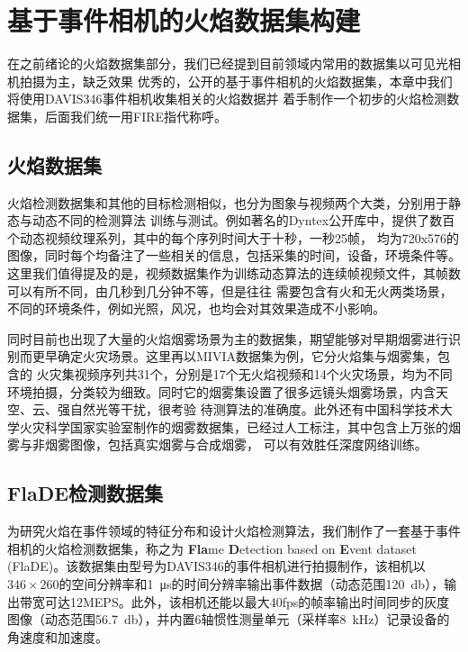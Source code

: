
\chapter{基于事件相机的火焰数据集构建}
在之前绪论的火焰数据集部分，我们已经提到目前领域内常用的数据集以可见光相机拍摄为主，缺乏效果
优秀的，公开的基于事件相机的火焰数据集，本章中我们将使用DAVIS346事件相机收集相关的火焰数据并
着手制作一个初步的火焰检测数据集，后面我们统一用FIRE指代称呼。

\section{火焰数据集}
火焰检测数据集和其他的目标检测相似，也分为图象与视频两个大类，分别用于静态与动态不同的检测算法
训练与测试。例如著名的Dyntex公开库\cite{peteri2008comprehensive}中，提供了数百个动态视频纹理系列，其中的每个序列时间大于十秒，一秒25帧，
均为720x576的图像，同时每个均备注了一些相关的信息，包括采集的时间，设备，环境条件等。这里我们值得提及的是，视频数据集作为训练动态算法的连续帧视频文件，其帧数可以有所不同，由几秒到几分钟不等，但是往往
需要包含有火和无火两类场景，不同的环境条件，例如光照，风况，也均会对其效果造成不小影响。

同时目前也出现了大量的火焰烟雾场景为主的数据集，期望能够对早期烟雾进行识别而更早确定火灾场景。这里再以MIVIA数据集\cite{foggia2015real}为例，它分火焰集与烟雾集，包含的
火灾集视频序列共31个，分别是17个无火焰视频和14个火灾场景，均为不同环境拍摄，分类较为细致。同时它的烟雾集设置了很多远镜头烟雾场景，内含天空、云、强自然光等干扰，很考验
待测算法的准确度。此外还有中国科学技术大学火灾科学国家实验室制作的烟雾数据集，已经过人工标注，其中包含上万张的烟雾与非烟雾图像，包括真实烟雾与合成烟雾，
可以有效胜任深度网络训练。

\section{FlaDE检测数据集}
为研究火焰在事件领域的特征分布和设计火焰检测算法，我们制作了一套基于事件相机的火焰检测数据集，称之为 \textbf{Fla}me \textbf{D}etection based on \textbf{E}vent dataset (FlaDE)。该数据集由型号为DAVIS346的事件相机进行拍摄制作，该相机以$346\times260$的空间分辨率和\SI{1}{\micro\second}的时间分辨率输出事件数据（动态范围\SI{120}{\decibel}），输出带宽可达12MEPS。此外，该相机还能以最大40fps的帧率输出时间同步的灰度图像（动态范围\SI{56.7}{\decibel}），并内置6轴惯性测量单元（采样率\SI{8}{\kilo\hertz}）记录设备的角速度和加速度。

